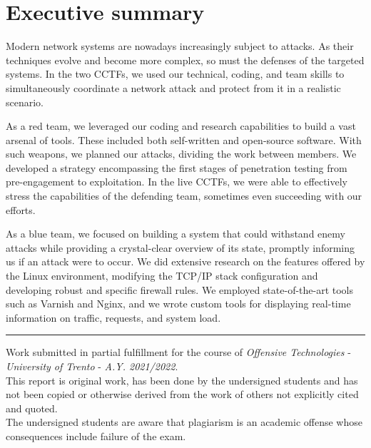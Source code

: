 \section{Executive summary}
\label{sec:executive-sumamry}

Modern network systems are nowadays increasingly subject to attacks. As their techniques evolve and become more complex, so must the defenses of the targeted systems. In the two CCTFs, we used our technical, coding, and team skills to simultaneously coordinate a network attack and protect from it in a realistic scenario. 

As a red team, we leveraged our coding and research capabilities to build a vast arsenal of tools. These included both self-written and open-source software. With such weapons, we planned our attacks, dividing the work between members. We developed a strategy encompassing the first stages of penetration testing from pre-engagement to exploitation. In the live CCTFs, we were able to effectively stress the capabilities of the defending team, sometimes even succeeding with our efforts.

As a blue team, we focused on building a system that could withstand enemy attacks while providing a crystal-clear overview of its state, promptly informing us if an attack were to occur. We did extensive research on the features offered by the Linux environment, modifying the TCP/IP stack configuration and developing robust and specific firewall rules. We employed state-of-the-art tools such as Varnish and Nginx, and we wrote custom tools for displaying real-time information on traffic, requests, and system load.

\smallskip%
\textcolor[RGB]{120,120,120}{\rule{\linewidth}{0.2pt}}%
\vspace{5pt}%

Work submitted in partial fulfillment for the course of \textit{Offensive Technologies} - \textit{University of Trento} - \textit{A.Y. 2021/2022}.
\medskip\\This report is original work, has been done by the undersigned students and has not been copied or otherwise derived from the work of others not explicitly cited and quoted. 
\medskip\\The undersigned students are aware that plagiarism is an academic offense whose consequences include failure of the exam.

